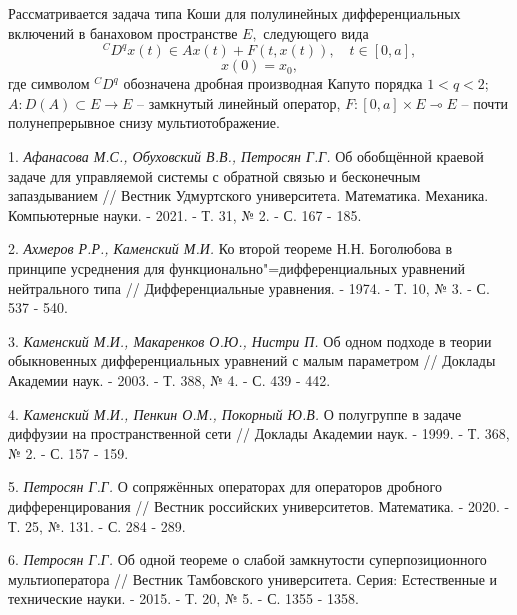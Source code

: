 
\vzmscaption

Рассматривается задача типа Коши для полулинейных дифференциальных включений в банаховом пространстве $E,$ следующего вида
$$
  ^CD^q x\left( t\right)\in Ax(t)+F(t,x(t)),\quad t \in \left[0,a\right],
$$
$$
x(0)=x_0,
$$
где символом $^{C}D^{q}$ обозначена дробная производная Капуто порядка  $1<q<2$; $A:D(A)\subset E \rightarrow E$ -- замкнутый линейный оператор, $F: [0,a] \times  E \multimap E$ -- почти полунепрерывное снизу мультиотображение.


\litlist

1. {\it Афанасова М.С., Обуховский В.В., Петросян Г.Г.} Об обобщённой краевой задаче для управляемой системы с обратной связью и бесконечным запаздыванием // Вестник Удмуртского университета. Математика. Механика. Компьютерные науки. - 2021. - Т. 31, № 2. -  С. 167 - 185.

2. {\it Ахмеров Р.Р., Каменский М.И.}  Ко второй теореме Н.Н. Боголюбова в принципе усреднения для функционально"=дифференциальных уравнений нейтрального типа // Дифференциальные уравнения. - 1974. - Т. 10, № 3. - С. 537 - 540.

3. {\it Каменский М.И., Макаренков О.Ю., Нистри П.} Об одном подходе в теории обыкновенных дифференциальных уравнений с малым параметром // Доклады Академии наук. - 2003. - Т. 388, № 4. - С. 439 - 442.

4. {\it Каменский М.И., Пенкин О.М., Покорный Ю.В.} О полугруппе в задаче диффузии на пространственной сети // Доклады Академии наук. - 1999. - Т. 368, № 2. - С. 157 - 159.

5.	{\it Петросян Г.Г.} О сопряжённых операторах для операторов дробного дифференцирования // Вестник российских университетов. Математика. - 2020. - Т. 25, №. 131. - С. 284 - 289.

6. {\it Петросян Г.Г.}  Об одной теореме о слабой замкнутости суперпозиционного мультиоператора // Вестник Тамбовского университета. Серия: Естественные и технические науки. - 2015. - Т. 20, № 5. - С. 1355 - 1358.

